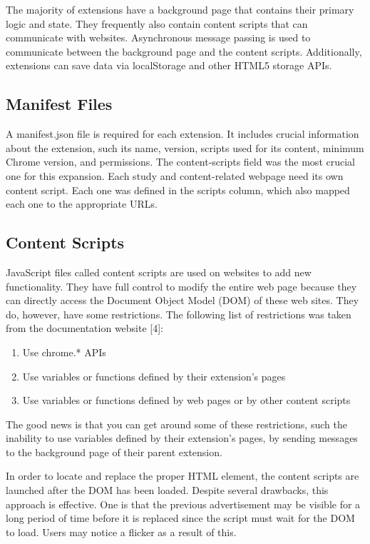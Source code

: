 The majority of extensions have a background page that contains their primary logic and state. They frequently also contain content scripts that can communicate with websites. Asynchronous message passing is used to communicate between the background page and the content scripts. Additionally, extensions can save data via localStorage and other HTML5 storage APIs.

\subsection{Manifest Files}

A manifest.json file is required for each extension. It includes crucial information about the extension, such its name, version, scripts used for its content, minimum Chrome version, and permissions. The content-scripts field was the most crucial one for this expansion. Each study and content-related webpage need its own content script. Each one was defined in the scripts column, which also mapped each one to the appropriate URLs.

\subsection{Content Scripts}

JavaScript files called content scripts are used on websites to add new functionality. They have full control to modify the entire web page because they can directly access the Document Object Model (DOM) of these web sites. They do, however, have some restrictions. The following list of restrictions was taken from the documentation website [4]:

\begin{enumerate}
  \item Use chrome.* APIs
  \item Use variables or functions defined by their extension's pages
  \item Use variables or functions defined by web pages or by other content scripts
\end{enumerate}

The good news is that you can get around some of these restrictions, such the inability to use variables defined by their extension's pages, by sending messages to the background page of their parent extension.

In order to locate and replace the proper HTML element, the content scripts are launched after the DOM has been loaded. Despite several drawbacks, this approach is effective. One is that the previous advertisement may be visible for a long period of time before it is replaced since the script must wait for the DOM to load. Users may notice a flicker as a result of this.

